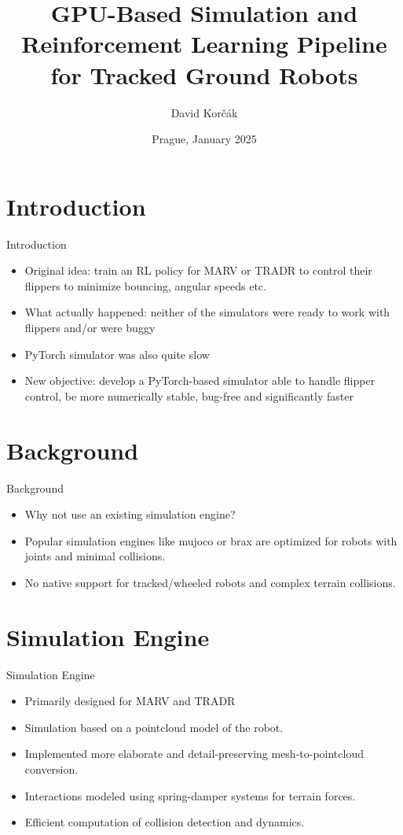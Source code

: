 \documentclass[12pt]{beamer}
\title[GPU-Based Simulation]{GPU-Based Simulation and Reinforcement Learning Pipeline for Tracked Ground Robots}
\author{David Korčák}
\date{Prague, January 2025}
\begin{document}
\frame{\titlepage}

\section{Introduction}
\begin{frame}{Introduction}
    \begin{itemize}
      \setlength\itemsep{1em}
        \item Original idea: train an RL policy for MARV or TRADR to control their flippers to minimize bouncing, angular speeds etc. 
        \item What actually happened: neither of the simulators were ready to work with flippers and/or were buggy
        \item PyTorch simulator was also quite slow
        \item New objective: develop a PyTorch-based simulator able to handle flipper control, be more numerically stable, bug-free and significantly faster
    \end{itemize}
\end{frame}

\section{Background}
\begin{frame}{Background}
    \begin{itemize}
      \setlength \itemsep{1em}
       \item Why not use an existing simulation engine?
        \item Popular simulation engines like mujoco or brax are optimized for robots with joints and minimal collisions.
        \item No native support for tracked/wheeled robots and complex terrain collisions.
    \end{itemize}
\end{frame}

\section{Simulation Engine}
\begin{frame}{Simulation Engine}
  \begin{itemize}
    \item Primarily designed for MARV and TRADR
    \item Simulation based on a pointcloud model of the robot.
    \item Implemented more elaborate and detail-preserving mesh-to-pointcloud conversion.
    \item Interactions modeled using spring-damper systems for terrain forces.
    \item Efficient computation of collision detection and dynamics.
\end{itemize}
\end{frame}
\end{document}
